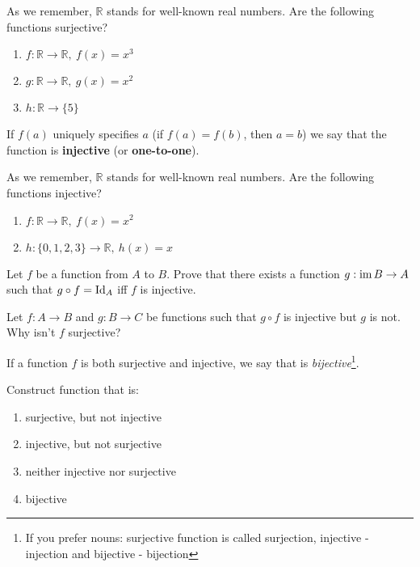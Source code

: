 \begin{prob}
	As we remember, $\mathbb{R}$ stands for well-known real numbers. Are the following functions surjective?
	\begin{enumerate}
		\item $f: \mathbb{R} \to \mathbb{R}, ~f(x)=x^3$
		\item $g: \mathbb{R} \to \mathbb{R}, ~g(x)=x^2$
		\item $h: \mathbb{R} \to \{5\}$
	\end{enumerate}
\end{prob}

If $f(a)$ uniquely specifies $a$ (if $f(a)=f(b)$, then $a=b$) we say that the function is \textbf{injective}
(or \textbf{one-to-one}).
\begin{exercise}
	As we remember, $\mathbb{R}$ stands for well-known real numbers. Are the following functions injective?
	\begin{enumerate}
		\item $f: \mathbb{R} \to \mathbb R, ~f(x)=x^2$
		\item $h: \{0,1,2,3\} \to \mathbb R, ~h(x)=x$
	\end{enumerate}
\end{exercise}

\begin{exercise}
	Let $f$ be a function from $A$ to $B$. Prove that there exists a function $g: \text{im\,} B\to A$ such that $g\circ f=\text{Id}_A$ iff $f$ is injective.
\end{exercise}

\begin{exercise}
	Let $f: A\to B$ and $g: B\to C$ be functions such that $g\circ f$ is injective but $g$ is not. Why isn't $f$ surjective?
\end{exercise}

If a function $f$ is both surjective and injective, we say that is \textit{bijective}\footnote{If you prefer nouns: surjective function is called surjection, injective - injection
and bijective - bijection}.

\begin{prob}
	Construct function that is:
	\begin{enumerate}
		\item surjective, but not injective
		\item injective, but not surjective
		\item neither injective nor surjective
		\item bijective
	\end{enumerate}
\end{prob}

